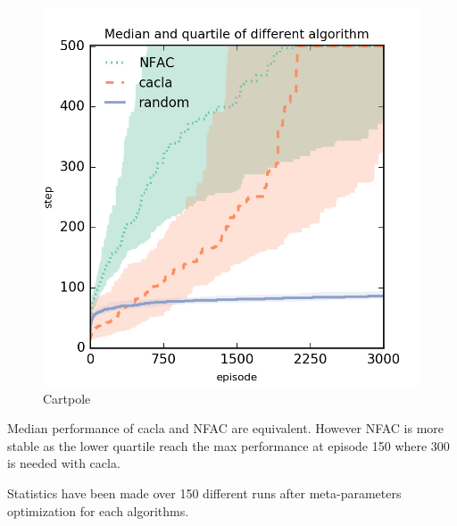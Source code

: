 \begin{figure}[h]
	\begin{center}
		\includegraphics{result_plotting/cartpole_perf.png}
		\caption{Cartpole}
		\label{image:cartpole_perf}
	\end{center}
\end{figure}


Median performance of cacla and NFAC are equivalent. However NFAC is more stable as the lower quartile reach the max performance
at episode 150 where 300 is needed with cacla.

Statistics have been made over 150 different runs after meta-parameters optimization for each algorithms.

